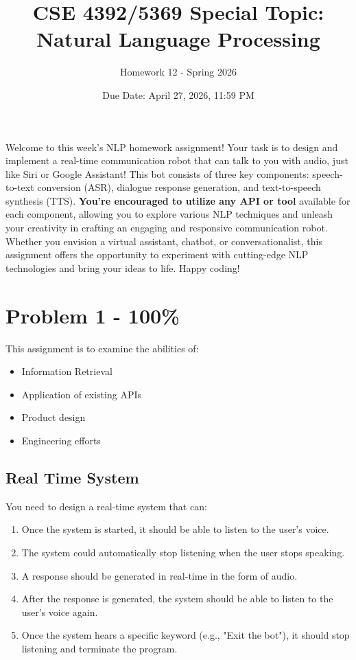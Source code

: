 \documentclass{article}
\begin{document}
\title{CSE 4392/5369 Special Topic: Natural Language Processing}
\author{Homework 12 - Spring 2026}
\date{Due Date: April 27, 2026, 11:59 PM}
\maketitle
\thispagestyle{fancy}


Welcome to this week's NLP homework assignment! 
Your task is to design and implement a real-time communication robot that can
talk to you with audio, just like Siri or Google Assistant!
This bot consists of three key components: speech-to-text conversion (ASR), 
 dialogue response generation, and text-to-speech synthesis (TTS). 
 \textbf{You're encouraged to utilize any API or tool} available for each component, 
 allowing you to explore various NLP techniques and 
 unleash your creativity in crafting an engaging and 
 responsive communication robot. Whether you envision a virtual assistant,
 chatbot, or conversationalist, this assignment offers the opportunity
 to experiment with cutting-edge NLP technologies and bring your ideas to life. 
 Happy coding!

\section*{Problem 1 - 100\%}

This assignment is to examine the abilities of:
\begin{itemize}
    \item Information Retrieval
    \item Application of existing APIs
    \item Product design
    \item Engineering efforts
\end{itemize}

\subsection*{Real Time System}
You need to design a real-time system that can:
\begin{enumerate}
    \item Once the system is started, it should be able to listen to the user's voice.
    \item The system could automatically stop listening when the user stops speaking.
    \item A response should be generated in real-time in the form of audio.
    \item After the response is generated, the system should be able to listen to the 
user's voice again.
    \item Once the system hears a specific keyword (e.g., "Exit the bot"), 
it should stop listening and terminate the program.
\end{enumerate}
\end{document}
